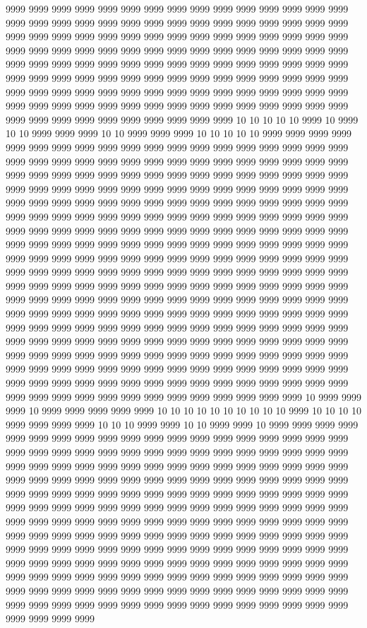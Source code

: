 9999 9999 9999 9999 9999 9999 9999 9999 9999 9999 9999 9999 9999 9999 9999 9999 9999 9999 9999 9999 9999 9999 9999 9999 9999 9999 9999 9999 9999 9999 9999 9999 9999 9999 9999 9999 9999 9999 9999 9999 9999 9999 9999 9999 9999 9999 9999 9999 9999 9999 9999 9999 9999 9999 9999 9999 9999 9999 9999 9999 9999 9999 9999 9999 9999 9999 9999 9999 9999 9999 9999 9999 9999 9999 9999 9999 9999 9999 9999 9999 9999 9999 9999 9999 9999 9999 9999 9999 9999 9999 9999 9999 9999 9999 9999 9999 9999 9999 9999 9999 9999 9999 9999 9999 9999 9999 9999 9999 9999 9999 9999 9999 9999 9999 9999 9999 9999 9999 9999 9999 9999 9999 9999 9999 9999 9999 9999 9999 9999 9999 10 10 10 10 10 9999 10 9999 10 10 9999 9999 9999 10 10 9999 9999 9999 10 10 10 10 10 9999 9999 9999 9999 9999 9999 9999 9999 9999 9999 9999 9999 9999 9999 9999 9999 9999 9999 9999 9999 9999 9999 9999 9999 9999 9999 9999 9999 9999 9999 9999 9999 9999 9999 9999 9999 9999 9999 9999 9999 9999 9999 9999 9999 9999 9999 9999 9999 9999 9999 9999 9999 9999 9999 9999 9999 9999 9999 9999 9999 9999 9999 9999 9999 9999 9999 9999 9999 9999 9999 9999 9999 9999 9999 9999 9999 9999 9999 9999 9999 9999 9999 9999 9999 9999 9999 9999 9999 9999 9999 9999 9999 9999 9999 9999 9999 9999 9999 9999 9999 9999 9999 9999 9999 9999 9999 9999 9999 9999 9999 9999 9999 9999 9999 9999 9999 9999 9999 9999 9999 9999 9999 9999 9999 9999 9999 9999 9999 9999 9999 9999 9999 9999 9999 9999 9999 9999 9999 9999 9999 9999 9999 9999 9999 9999 9999 9999 9999 9999 9999 9999 9999 9999 9999 9999 9999 9999 9999 9999 9999 9999 9999 9999 9999 9999 9999 9999 9999 9999 9999 9999 9999 9999 9999 9999 9999 9999 9999 9999 9999 9999 9999 9999 9999 9999 9999 9999 9999 9999 9999 9999 9999 9999 9999 9999 9999 9999 9999 9999 9999 9999 9999 9999 9999 9999 9999 9999 9999 9999 9999 9999 9999 9999 9999 9999 9999 9999 9999 9999 9999 9999 9999 9999 9999 9999 9999 9999 9999 9999 9999 9999 9999 9999 9999 9999 9999 9999 9999 9999 9999 9999 9999 9999 9999 9999 9999 9999 9999 9999 9999 9999 9999 9999 9999 9999 9999 9999 9999 9999 9999 9999 9999 9999 9999 9999 9999 9999 9999 9999 9999 9999 9999 9999 9999 9999 9999 9999 9999 9999 9999 9999 9999 9999 9999 9999 9999 9999 10 9999 9999 9999 10 9999 9999 9999 9999 9999 10 10 10 10 10 10 10 10 10 10 9999 10 10 10 10 9999 9999 9999 9999 10 10 10 9999 9999 10 10 9999 9999 10 9999 9999 9999 9999 9999 9999 9999 9999 9999 9999 9999 9999 9999 9999 9999 9999 9999 9999 9999 9999 9999 9999 9999 9999 9999 9999 9999 9999 9999 9999 9999 9999 9999 9999 9999 9999 9999 9999 9999 9999 9999 9999 9999 9999 9999 9999 9999 9999 9999 9999 9999 9999 9999 9999 9999 9999 9999 9999 9999 9999 9999 9999 9999 9999 9999 9999 9999 9999 9999 9999 9999 9999 9999 9999 9999 9999 9999 9999 9999 9999 9999 9999 9999 9999 9999 9999 9999 9999 9999 9999 9999 9999 9999 9999 9999 9999 9999 9999 9999 9999 9999 9999 9999 9999 9999 9999 9999 9999 9999 9999 9999 9999 9999 9999 9999 9999 9999 9999 9999 9999 9999 9999 9999 9999 9999 9999 9999 9999 9999 9999 9999 9999 9999 9999 9999 9999 9999 9999 9999 9999 9999 9999 9999 9999 9999 9999 9999 9999 9999 9999 9999 9999 9999 9999 9999 9999 9999 9999 9999 9999 9999 9999 9999 9999 9999 9999 9999 9999 9999 9999 9999 9999 9999 9999 9999 9999 9999 9999 9999 9999 9999 9999 9999 9999 9999 9999 9999 9999 9999 9999 9999 9999 9999 9999 9999 9999 9999 9999 9999 9999 9999 9999 9999 